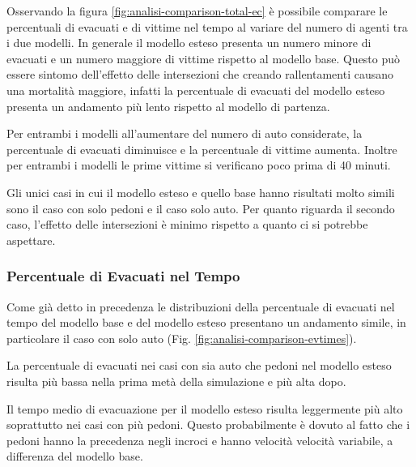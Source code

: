 Osservando la figura \ref{fig:analisi-comparison-total-ec} è possibile comparare le percentuali di evacuati e di vittime nel tempo al variare del numero di agenti tra i due modelli.
In generale il modello esteso presenta un numero minore di evacuati e un numero maggiore di vittime rispetto al modello base.
Questo può essere sintomo dell'effetto delle intersezioni che creando rallentamenti causano una mortalità maggiore,
infatti la percentuale di evacuati del modello esteso presenta un andamento più lento rispetto al modello di partenza.

Per entrambi i modelli all'aumentare del numero di auto considerate, la percentuale di evacuati diminuisce e la percentuale di vittime aumenta.
Inoltre per entrambi i modelli le prime vittime si verificano poco prima di 40 minuti.

Gli unici casi in cui il modello esteso e quello base hanno risultati molto simili sono il caso con solo pedoni e il caso solo auto.
Per quanto riguarda il secondo caso, l'effetto delle intersezioni è minimo rispetto a quanto ci si potrebbe aspettare.


\subsubsection*{Percentuale di Evacuati nel Tempo}

Come già detto in precedenza le distribuzioni della percentuale di evacuati nel tempo del modello base e del modello esteso
presentano un andamento simile, in particolare il caso con solo auto (Fig. \ref{fig:analisi-comparison-evtimes}).

La percentuale di evacuati nei casi con sia auto che pedoni nel modello esteso risulta più bassa nella prima metà
della simulazione e più alta dopo.

Il tempo medio di evacuazione per il modello esteso risulta leggermente più alto soprattutto nei casi con più pedoni.
Questo probabilmente è dovuto al fatto che i pedoni hanno la precedenza negli incroci e hanno velocità velocità variabile, a differenza del modello base.


